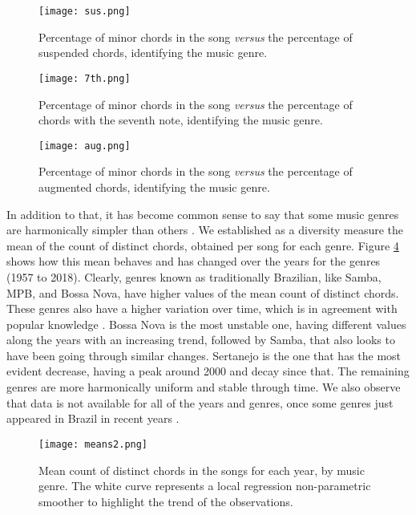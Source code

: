 \documentclass[twocolumn]{article}
\begin{document}
\begin{figure}[t]
\centering
\texttt{[image: sus.png]}
\caption{Percentage of minor chords 
in the song \textit{versus} the percentage
of suspended chords, identifying the music
genre.}
\label{fig:sus}
\end{figure}


\begin{figure}[t]
\centering
\texttt{[image: 7th.png]}
\caption{Percentage of minor chords 
in the song \textit{versus} the percentage
of chords with the seventh note, 
identifying the music genre.}
\label{fig:7th}
\end{figure}

\begin{figure}[t]
\centering
\texttt{[image: aug.png]}
\caption{Percentage of minor chords 
in the song \textit{versus} the percentage
of augmented chords, identifying the music
genre.}
\label{fig:aug}
\end{figure}


In addition to that, it has become common sense to say 
that some music genres are harmonically simpler 
than others \cite{Almada2012}. We established as
a diversity measure the mean of the count of distinct 
chords, obtained per song for each genre. 
Figure \ref{fig:explor} shows how this mean behaves and
has changed over the years for the genres (1957 to 2018). Clearly, 
genres known as traditionally Brazilian, 
like Samba, MPB, and Bossa Nova, have higher values 
of the mean count of distinct chords. These genres 
also have a higher variation over time, 
which is in agreement with popular knowledge
\cite{Caldas2010}. Bossa Nova is the most
unstable one, having different values along the years
with an increasing trend, followed by Samba, that also
looks to have been going through similar changes. 
Sertanejo is the one that has the most evident
decrease, having a peak around 2000 and decay since that. The remaining genres are more harmonically uniform
and stable through time. We also observe
that data is not available for all of the years and genres, once some genres just appeared in Brazil in 
recent years \cite{Caldas2010}. 

\begin{figure}[h]
\centering
\texttt{[image: means2.png]}
\caption{Mean count of distinct chords in the songs for each year, by music genre. The white curve represents a local regression non-parametric smoother to highlight the trend of the observations.}
\label{fig:explor}
\end{figure}
\end{document}
